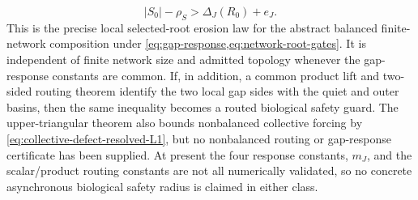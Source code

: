 \[
 |S_0|-\rho_S>\Delta_J(R_0)+e_J.
\]
This is the precise local selected-root erosion law for the abstract balanced
finite-network composition under \cref{eq:gap-response,eq:network-root-gates}.
It is independent of finite network size and admitted topology whenever the
gap-response constants are common.  If, in addition, a common product lift
and two-sided routing theorem identify the two local gap sides with the quiet
and outer basins, then the same inequality becomes a routed biological safety
guard.  The upper-triangular theorem
also bounds nonbalanced collective forcing by
\cref{eq:collective-defect-resolved-L1}, but no nonbalanced routing or
gap-response certificate has been supplied.  At present the four response
constants, \(m_J\), and the scalar/product routing constants are not all
numerically validated, so no concrete asynchronous biological safety radius
is claimed in either class.
